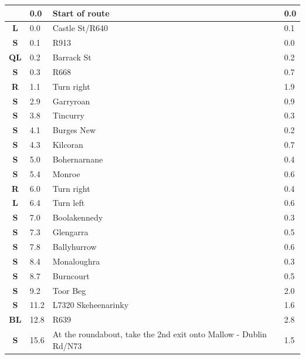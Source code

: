 \documentclass[11pt]{article}
\begin{document}
\renewcommand{\arraystretch}{1.15}
\twocolumn
{}
\tabletail{\hline}
\tablelasttail{\hline}
\begin{center}
  \begin{supertabular}{|c|p{0.30in}|p{2.25in}|l|}
  \hline
{} \textbf{} &   0.0 & Start of route &   0.0 \\ \hline
 \textbf{L} &   0.0 & Castle St/\hspace{0pt}R640 &   0.1 \\ \hline
 \textbf{S} &   0.1 & R913 &   0.0 \\ \hline
 \textbf{QL} &   0.2 & Barrack St &   0.2 \\ \hline
 \textbf{S} &   0.3 & R668 &   0.7 \\ \hline
{} \textbf{R} &   1.1 & Turn right &   1.9 \\ \hline
 \textbf{S} &   2.9 & Garryroan &   0.9 \\ \hline
 \textbf{S} &   3.8 & Tincurry &   0.3 \\ \hline
 \textbf{S} &   4.1 & Burges New &   0.2 \\ \hline
 \textbf{S} &   4.3 & Kilcoran &   0.7 \\ \hline
 \textbf{S} &   5.0 & Bohernarnane &   0.4 \\ \hline
 \textbf{S} &   5.4 & Monroe &   0.6 \\ \hline
{} \textbf{R} &   6.0 & Turn right &   0.4 \\ \hline
 \textbf{L} &   6.4 & Turn left &   0.6 \\ \hline
 \textbf{S} &   7.0 & Boolakennedy &   0.3 \\ \hline
 \textbf{S} &   7.3 & Glengarra &   0.5 \\ \hline
 \textbf{S} &   7.8 & Ballyhurrow &   0.6 \\ \hline
 \textbf{S} &   8.4 & Monaloughra &   0.3 \\ \hline
 \textbf{S} &   8.7 & Burncourt &   0.5 \\ \hline
 \textbf{S} &   9.2 & Toor Beg &   2.0 \\ \hline
 \textbf{S} &  11.2 & L7320 Skeheenarinky &   1.6 \\ \hline
 \textbf{BL} &  12.8 & R639 &   2.8 \\ \hline
 \textbf{S} &  15.6 & At the roundabout, take the 2nd exit onto Mallow - Dublin Rd/\hspace{0pt}N73 &   1.5 \\ \hline

\end{supertabular}
\end{center}
\end{document}
